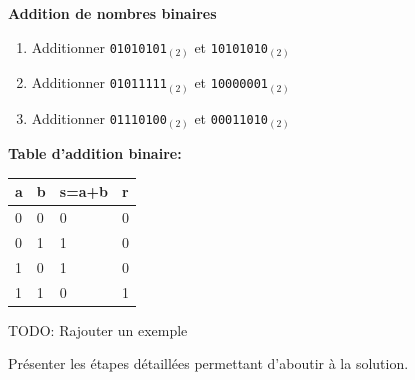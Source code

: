 \begin{Exercice}[15 minutes] \textbf{Addition de nombres binaires}
    \begin{enumerate}
        \item Additionner \lstinline{01010101}$_{(2)}$ et \lstinline{10101010}$_{(2)}$
        \item Additionner \lstinline{01011111}$_{(2)}$ et \lstinline{10000001}$_{(2)}$
        \item Additionner \lstinline{01110100}$_{(2)}$ et \lstinline{00011010}$_{(2)}$
    \end{enumerate}
    \begin{conseil}
\textbf{Table d'addition binaire:}\\
        \begin{tabular}{| C{0.1\textwidth} | C{0.1\textwidth} | C{0.1\textwidth} | C{0.1\textwidth} |} 
            \hline
            \textbf{a} & \textbf{b} & \textbf{s=a+b} & \textbf{r}\\ [0.5ex]
             & 0 & 0 & 0 \\ [0.5ex] 
             & 1 & 1 & 0 \\ [0.5ex] 
             & 0 & 1 & 0 \\ [0.5ex] 
             & 1 & 0 & 1 \\ [0.5ex] 
            \hline
        \end{tabular}
    \end{conseil}
    TODO: Rajouter un exemple
    \begin{solution}
        Présenter les étapes détaillées permettant d'aboutir à la solution.
    \end{solution}
\end{Exercice}

